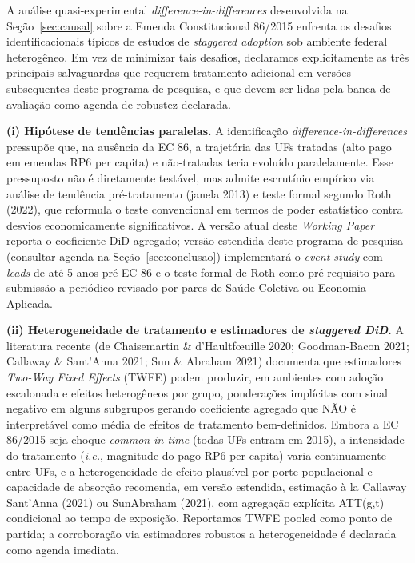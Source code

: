 \documentclass[12pt,a4paper,oneside]{article}
\begin{document}
A análise quasi-experimental \textit{difference-in-differences}
desenvolvida na Seção~\ref{sec:causal} sobre a Emenda Constitucional
86/2015 enfrenta os desafios identificacionais típicos de estudos
de \textit{staggered adoption} sob ambiente federal heterogêneo.
Em vez de minimizar tais desafios, declaramos explicitamente as
três principais salvaguardas que requerem tratamento adicional em
versões subsequentes deste programa de pesquisa, e que devem ser
lidas pela banca de avaliação como agenda de robustez declarada.

\textbf{(i) Hipótese de tendências paralelas.}
A identificação \textit{difference-in-differences} pressupõe que,
na ausência da EC 86, a trajetória das UFs tratadas (alto pago
em emendas RP6 per capita) e não-tratadas teria evoluído
paralelamente. Esse pressuposto não é diretamente testável, mas
admite escrutínio empírico via análise de tendência pré-tratamento
(janela 2013) e teste formal segundo Roth (2022),
que reformula o teste convencional em termos de poder estatístico
contra desvios economicamente significativos. A versão atual
deste \textit{Working Paper} reporta o coeficiente DiD agregado;
versão estendida deste programa de pesquisa (consultar
agenda na Seção~\ref{sec:conclusao}) implementará o
\textit{event-study} com \textit{leads} de até 5 anos pré-EC 86 e
o teste formal de Roth como pré-requisito para submissão a
periódico revisado por pares de Saúde Coletiva ou Economia
Aplicada.

\textbf{(ii) Heterogeneidade de tratamento e estimadores de
\textit{staggered DiD}.} A literatura recente (de Chaisemartin
\& d'Haultfœuille 2020; Goodman-Bacon 2021; Callaway \&
Sant'Anna 2021; Sun \& Abraham 2021) documenta que estimadores
\textit{Two-Way Fixed Effects} (TWFE) podem produzir, em ambientes
com adoção escalonada e efeitos heterogêneos por grupo, ponderações
implícitas com sinal negativo em alguns subgrupos \textemdash{}
gerando coeficiente agregado que NÃO é interpretável como média de
efeitos de tratamento bem-definidos. Embora a EC 86/2015 seja choque
\textit{common in time} (todas UFs entram em 2015), a intensidade
do tratamento (\textit{i.e.}, magnitude do pago RP6 per capita)
varia continuamente entre UFs, e a heterogeneidade de efeito
plausível por porte populacional e capacidade de absorção
recomenda, em versão estendida, estimação à la Callaway\textendash
Sant'Anna (2021) ou Sun\textendash Abraham (2021), com agregação
explícita ATT(g,t) condicional ao tempo de exposição. Reportamos
TWFE pooled como ponto de partida; a corroboração via estimadores
robustos a heterogeneidade é declarada como agenda imediata.
\end{document}
